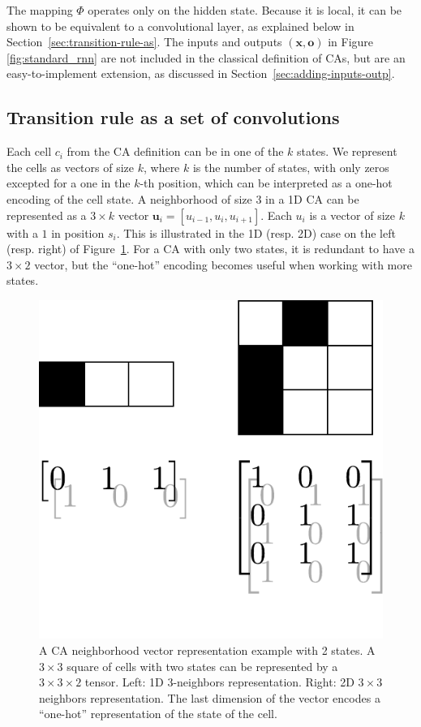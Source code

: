 The mapping $\Phi$ operates only on the hidden state. Because it is local,
it can be shown to be equivalent to a convolutional layer, as explained below in
Section~\ref{sec:transition-rule-as}. The inputs and outputs
$(\mathbf{x}, \mathbf{o})$ in Figure \ref{fig:standard_rnn} are not included
in the classical definition of \acp{CA}, but are an easy-to-implement extension, as
discussed in Section~\ref{sec:adding-inputs-outp}.

\subsection{Transition rule as a set of convolutions\label{sec:transition-rule-as}}

Each cell $c_i$ from the \ac{CA} definition can be in one of the $k$ states. We
represent the cells as vectors of size $k$, where $k$ is the number of states, with only
zeros excepted for a one in the $k$-th position, which can be interpreted as a 
one-hot encoding of the cell state. A neighborhood of size $3$ in a
1D CA can be represented as a $3 \times k$ vector
$\mathbf{u}_i = [u_{i-1}, u_{i}, u_{i+1}]$. Each $u_{i}$ is a vector of size $k$
with a $1$ in position $s_i$. This is illustrated in the 1D (resp. 2D) case on
the left (resp. right) of Figure~\ref{fig:cell}. For a CA with only two states,
it is redundant to have a $3 \times 2$ vector, but the ``one-hot'' encoding
becomes useful when working with more states.

\begin{figure}[htbp]
  \centering
  \includegraphics[width=.4\linewidth]{figures/repr}
  \caption{\label{fig:cell}A \ac{CA} neighborhood vector representation example
    with 2 states. A $3\times 3$ square of cells with two states can be represented
    by a $3\times 3 \times 2$ tensor. Left: 1D 3-neighbors representation. Right: 2D $3\times3$
    neighbors representation. The last dimension of the vector encodes a
    ``one-hot'' representation of the state of the cell.}

\end{figure}


